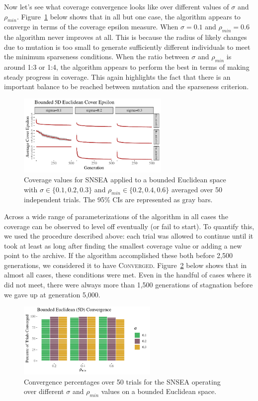 \documentclass[twoside]{article}
\begin{document}
Now let's see what coverage convergence looks like over different values of $\sigma$ and $\rho_{min}$.  Figure~\ref{fig:bounded:nopop:sm} below shows that in all but one case, the algorithm appears to converge in terms of the coverage epsilon measure.  When $\sigma=0.1$ and $\rho_{min} = 0.6$ the algorithm never improves at all.  This is because the radius of likely changes due to mutation is too small to generate sufficiently different individuals to meet the minimum sparseness conditions.  When the ratio between $\sigma$ and $\rho_{min}$ is around 1:3 or 1:4, the algorithm appears to perform the best in terms of making steady progress in coverage.  This again highlights the fact that there is an important balance to be reached between mutation and the sparseness criterion.
%
\begin{figure}[ht]
  \center\includegraphics[width=0.65\textwidth]{Figures/bounded-500sm-NOPOP.pdf}
  \caption{\label{fig:bounded:nopop:sm} Coverage values for SNSEA applied to a bounded Euclidean space with $\sigma\in\{0.1,  0.2, 0.3\}$ and $\rho_{min} \in \{0.2, 0.4, 0.6\}$ averaged over 50 independent trials.  The 95\% CIs are represented as gray bars.}
\end{figure}

Across a wide range of parameterizations of the algorithm in all cases the coverage can be observed to level off eventually (or fail to start).  To quantify this, we used the procedure described above:  each trial was allowed to continue until it took at least as long after finding the smallest coverage value or adding a new point to the archive.  If the algorithm accomplished these both before 2,500 generations, we considered it to have \textsc{Converged}.  Figure~\ref{fig:bounded:nopop:conv1} below shows that in almost all cases, these conditions were met.  Even in the handful of cases where it did not meet, there were always more than 1,500 generations of stagnation before we gave up at generation 5,000.  
%
\begin{figure}[ht]
  \center\includegraphics[width=0.6\textwidth]{Figures/bounded-conv-NOPOP.pdf}
  \caption{\label{fig:bounded:nopop:conv1} Convergence percentages over 50 trials for the SNSEA operating over different $\sigma$ and $\rho_{min}$ values on a bounded Euclidean space.}
\end{figure}
\end{document}
